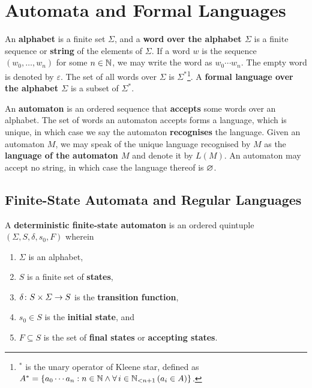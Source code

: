 


\usepackage{tikz}
\usetikzlibrary{automata,decorations.markings}
\newcommand*{\pt}{5mm}


\section{Automata and Formal Languages}

An {\bf alphabet} is a finite set \(\varSigma\), and a {\bf word over the
alphabet \(\varSigma\)} is a finite sequence or {\bf string} of the elements of
\(\varSigma\). If a word \(w\) is the sequence \((w_0, \ldots, w_n)\) for some
\(n \in \setnat\), we may write the word as \(w_0 \cdots w_n\). The empty word
is denoted by \(\varepsilon\). The set of all words over \(\varSigma\) is
\(\varSigma^*\)\footnote{\(^*\) is the unary operator of Kleene star, defined
as \(A^* = \set{a_0 \cdots a_n : n \in \setnat \land \forall \, i \in \Nln[n +
1] \, (a_i \in A)}\).}. A {\bf formal language over the alphabet \(\varSigma\)}
is a subset of \(\varSigma^*\).

An {\bf automaton} is an ordered sequence that {\bf accepts} some words over an
alphabet. The set of words an automaton accepts forms a language, which is
unique, in which case we say the automaton {\bf recognises} the language. Given
an automaton \(M\), we may speak of the unique language recognised by \(M\) as
the {\bf language of the automaton \(M\)} and denote it by \(L(M)\). An
automaton may accept no string, in which case the language thereof is \(\nset\).

\subsection{Finite-State Automata and Regular Languages}

\Bdf
    A {\bf deterministic finite-state automaton} is an ordered quintuple
    \((\varSigma, S, \delta, s_0, F)\) wherein
    \begin{enumerate}
        \item \(\varSigma\) is an alphabet,
        \item \(S\) is a finite set of {\bf states},
        \item \(\map{\delta}{S \times \varSigma}{S}\) is the {\bf transition
        function},
        \item \(s_0 \in S\) is the {\bf initial state}, and
        \item \(F \subseteq S\) is the set of {\bf final states} or {\bf
        accepting states}.
    \end{enumerate}
\Edf

